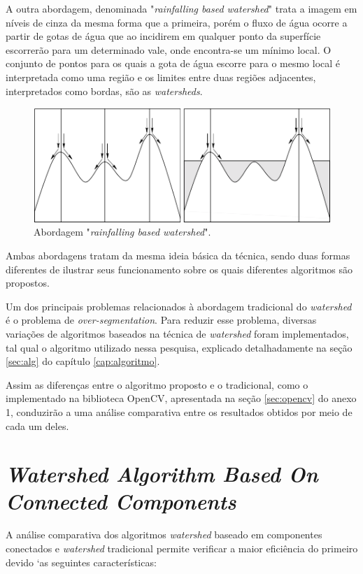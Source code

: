A outra abordagem, denominada "\textit{rainfalling based watershed}" trata a imagem em níveis de cinza da mesma forma que a primeira, porém o fluxo de água ocorre a partir de gotas de água que ao incidirem em qualquer ponto da superfície escorrerão para um determinado vale, onde encontra-se um mínimo local. O conjunto de pontos para os quais a gota de água escorre para o mesmo local é interpretada como uma região e os limites entre duas regiões adjacentes,  interpretados como bordas, são as \textit{watersheds}. \citep{l6} 

	\begin{figure}[!htb]
       \begin{center}  
          \includegraphics[width=0.6\columnwidth]{img/abordagem_rainfalling.jpg}
           \caption{\label{fig:abordagem_rainfalling}Abordagem "\textit{rainfalling based watershed}". \cite{ruparelia2012implementation}}
       \end{center}
   \end{figure} 
	

Ambas abordagens tratam da mesma ideia básica da técnica, sendo duas formas diferentes de ilustrar seus funcionamento sobre os quais diferentes algoritmos são propostos.

Um dos principais problemas relacionados à abordagem tradicional do \textit{watershed} é o problema de \textit{over-segmentation}. Para reduzir esse problema, diversas variações de algoritmos baseados na técnica de \textit{watershed} foram implementados, tal qual o algoritmo utilizado nessa pesquisa, explicado detalhadamente na seção \ref{sec:alg} do capítulo \ref{cap:algoritmo}. 

Assim as diferenças entre o algoritmo proposto e o tradicional, como o implementado na biblioteca OpenCV, apresentada na seção \ref{sec:opencv} do anexo 1, conduzirão a uma análise comparativa entre os resultados obtidos por meio de cada um deles.

\section{\textit{Watershed Algorithm Based On Connected Components}}
A análise comparativa dos algoritmos \textit{watershed} baseado em componentes conectados e \textit{watershed} tradicional permite verificar a maior eficiência do primeiro devido `as seguintes características:

